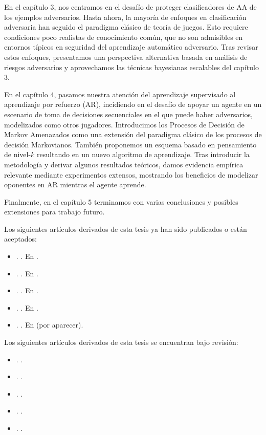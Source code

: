 \documentclass[a4paper, 11pt, openright, twoside]{reportPhD}
\numberwithin{figure}{chapter}
\numberwithin{table}{chapter}
\numberwithin{equation}{chapter}
\begin{document}
En el capítulo 3, nos centramos en el desafío de proteger clasificadores de AA de los ejemplos adversarios. Hasta ahora, la mayoría de enfoques en clasificación adversaria han seguido el paradigma clásico de teoría de juegos. Esto requiere condiciones poco realistas de conocimiento común, que no son admisibles en entornos típicos en seguridad del aprendizaje automático adversario. Tras revisar estos enfoques, presentamos una perspectiva alternativa basada en análisis de riesgos adversarios y aprovechamos las técnicas bayesianas escalables del capítulo 3.

En el capítulo 4, pasamos nuestra atención del aprendizaje supervisado al aprendizaje por refuerzo (AR), incidiendo en el desafío de apoyar un agente en un escenario de toma de decisiones secuenciales en el que puede haber adversarios, modelizados como otros jugadores. Introducimos los Procesos de Decisión de Markov Amenazados como una extensión del paradigma clásico de los procesos de decisión Markovianos. También proponemos un esquema basado en pensamiento de nivel-$k$ resultando en un nuevo algoritmo de aprendizaje. Tras introducir la metodología y derivar algunos resultados teóricos, damos evidencia empírica relevante mediante experimentos extensos, mostrando los beneficios de modelizar oponentes en AR mientras el agente aprende.

Finalmente, en el capítulo 5 terminamos con varias conclusiones y posibles extensiones para trabajo futuro.

\vspace{1cm}
Los siguientes artículos derivados de esta tesis ya han sido publicados o están aceptados:
\begin{itemize}
    \item \cite{gallego2019dlms}. . En .
    \item \cite{gallego2019reinforcement}. . En .
     \item \cite{gallego2019vis}. . En .   
     \item \cite{math8111957}. . En .
     \item \cite{nn2022}. . En  (por aparecer).
\end{itemize}

Los siguientes artículos derivados de esta tesis se encuentran bajo revisión:
\begin{itemize}
    \item \citeauthor{gallego2019opponent}. . 
        \item \citeauthor{gallego2021data}. . 
    \item \citeauthor{gallego2018stochastic}. . 
    \item \citeauthor{AMLARA}. .
     \item \citeauthor{gallego2020protecting}. . 
\end{itemize}
\end{document}
